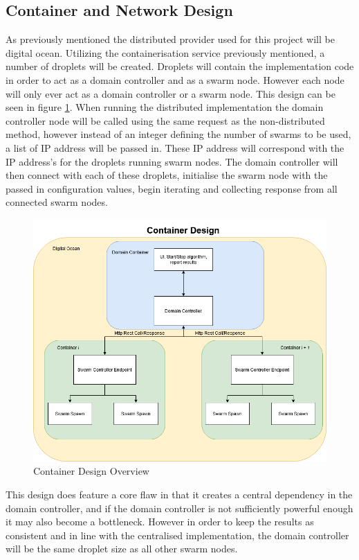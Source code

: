 \documentclass[oneside,12pt]{book}
\begin{document}
\subsection{Container and Network Design}
As previously mentioned the distributed provider used for this project will be digital ocean. Utilizing the containerisation service previously mentioned, a number of droplets will be created. Droplets will contain the implementation code in order to act as a domain controller and as a swarm node. However each node will only ever act as a domain controller or a swarm node. This design can be seen in figure \ref{fig:ContainerDesignOverview}. When running the distributed implementation the domain controller node will be called using the same request as the non-distributed method, however instead of an integer defining the number of swarms to be used, a list of IP address will be passed in. These IP address will correspond with the IP address's for the droplets running swarm nodes. The domain controller will then connect with each of these droplets, initialise the swarm node with the passed in configuration values, begin iterating and collecting response from all connected swarm nodes.

\begin{figure}[H]
    \centering
    \includegraphics[scale=0.4]{Images/ContainerDesign.png}
    \caption{Container Design Overview}
    \label{fig:ContainerDesignOverview}
\end{figure}

This design does feature a core flaw in that it creates a central dependency in the domain controller, and if the domain controller is not sufficiently powerful enough it may also become a bottleneck. However in order to keep the results as consistent and in line with the centralised implementation, the domain controller will be the same droplet size as all other swarm nodes. 
\end{document}
